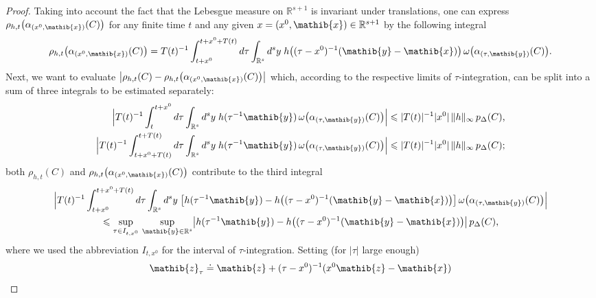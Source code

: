\documentclass[11pt,twoside,openright]{report}
\theoremstyle{definition}
\theoremstyle{plain}
\theoremstyle{remark}
\theoremstyle{assumption}
\newcommand{\abs}[1]{\lvert #1 \rvert}
\newcommand{\babs}[1]{\bigl\lvert #1 \bigr\rvert}
\newcommand{\Babs}[1]{\Bigl\lvert #1 \Bigr\rvert}
\newcommand{\norm}[1]{\lVert #1 \rVert}
\newcommand{\pDx}[1]{p_\Delta ( #1 )}
\newcommand{\xib}{\mathib{x}}
\newcommand{\yib}{\mathib{y}}
\newcommand{\zib}{\mathib{z}}
\newcommand{\Rs}{\mathbb{R}^s}
\newcommand{\Rsone}{\mathbb{R}^{s + 1}}
\begin{document}
\begin{proof}
  Taking into account the fact that the Lebesgue measure on $\Rsone$
  is invariant under translations, one can express $\rho_{h , t}
  \bigl( \alpha_{( x^0 , \xib )} ( C ) \bigr)$ for any finite time $t$
  and any given $x = ( x^0 , \xib ) \in \Rsone$ by the following
  integral
  \begin{equation*}
    \rho_{h , t} \bigl( \alpha_{( x^0 , \xib )} ( C ) \bigr) = T ( t
    )^{-1} \int_{t + x^0}^{t + x^0 + T ( t )} d \tau \int_{\Rs} d^s y
    \; h \bigl( ( \tau - x^0 )^{-1} ( \yib - \xib ) \bigr) \, \omega
    \bigl( \alpha_{( \tau , \yib )} ( C ) \bigr) \text{.}
  \end{equation*}
  Next, we want to evaluate $\babs{\rho_{h , t} ( C ) - \rho_{h , t}
  \bigl( \alpha_{( x^0 , \xib )} ( C ) \bigr)}$ which, according to
  the respective limits of $\tau$-integration, can be split into a sum
  of three integrals to be estimated separately:
  \begin{align*}
    \Babs{T ( t )^{-1} \int_t^{t + x^0} d \tau \int_{\Rs} d^s y \; h (
    \tau^{-1} \yib ) \, \omega \bigl( \alpha_{( \tau , \yib )} ( C )
    \bigr)} & \leqslant \abs{T ( t )}^{-1} \abs{x^0} \,
    \norm{h}_\infty \, \pDx{C} \text{,} \\
    \Babs{T ( t )^{-1} \int_{t + x^0 + T ( t )}^{t + T ( t )} d \tau
    \int_{\Rs} d^s y \; h ( \tau^{-1} \yib ) \, \omega \bigl(
    \alpha_{( \tau , \yib )} ( C ) \bigr)} & \leqslant \abs{T ( t
    )}^{-1} \abs{x^0} \, \norm{h}_\infty \, \pDx{C} \text{;}
  \end{align*}
  both $\rho_{h , t} ( C )$ and $\rho_{h , t} \bigl( \alpha_{( x^0 ,
  \xib )} ( C ) \bigr)$ contribute to the third integral
  \begin{multline*}
    \Babs{T ( t )^{-1} \int_{t + x^0}^{t + x^0 + T ( t )} d \tau
    \int_{\Rs} d^s y \; \bigl[ h ( \tau^{-1} \yib ) - h \bigl( ( \tau
    - x^0 )^{-1} ( \yib - \xib ) \bigr) \bigr] \, \omega \bigl(
    \alpha_{( \tau , \yib )} ( C ) \bigr)} \\
    \leqslant \sup_{\tau \in I_{t , x^0}} \, \sup_{\yib \in \Rs}
    \babs{h ( \tau^{-1} \yib ) - h \bigl( ( \tau - x^0 )^{-1} ( \yib -
    \xib ) \bigr)} \, \pDx{C} \text{,}
  \end{multline*}
  where we used the abbreviation $I_{t , x^0}$ for the interval of
  $\tau$-integration. Setting (for $\abs{\tau}$ large enough)
  \begin{equation*}
    \zib_\tau \doteq \zib + ( \tau - x^0 )^{-1} ( x^0 \zib - \xib )
  \end{equation*}

\end{proof}
\end{document}
